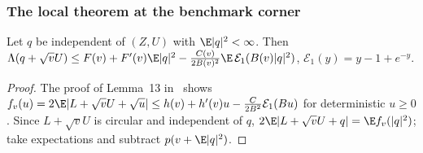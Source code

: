 \subsubsection{The local theorem at the benchmark corner}

\begin{corollary}\label{tdb-cor:bern2}
Let $q$ be independent of $(Z,U)$ with $\E|q|^2<\infty$. Then
$\Lambda(q+\sqrt vU)\le F(v)+F'(v)\E|q|^2-\frac{C(v)}{2B(v)^2}\E\,\mathcal E_1(B(v)|q|^2)$, $\mathcal E_1(y)=y-1+e^{-y}$.
\end{corollary}
\begin{proof}
The proof of Lemma~13 in \Sd\ shows $f_v(u)=2\E|L+\sqrt vU+\sqrt u|\le h(v)+h'(v)u-\frac C{2B^2}\mathcal E_1(Bu)$ for deterministic $u\ge0$. Since
$L+\sqrt vU$ is circular and independent of $q$, $2\E|L+\sqrt vU+q|=\E f_v(|q|^2)$; take expectations and subtract $p(v+\E|q|^2)$.
\end{proof}

